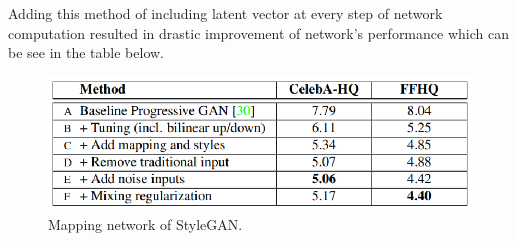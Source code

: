 \documentclass[12pt,a4paper,openany]{book}
\begin{document}
Adding this method of including latent vector at every step of network computation resulted in drastic improvement of network's performance which can be see in the table below.

\begin{figure}[ht!]
    \centering
    \includegraphics[scale=1.2]{figs/frechet-distance.eps}
    \caption{Mapping network of StyleGAN.}\label{Fig:STYLEGAN}
\end{figure}









\end{document}
